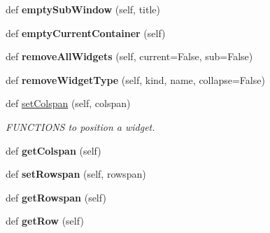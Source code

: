 \begin{DoxyCompactItemize}
def {\bfseries empty\+Sub\+Window} (self, title)
\item 
\mbox{\label{class_python_01_g_u_i_1_1appjar_1_1gui_a349ee206b43493b008e83422e02e1c1d}} 
def {\bfseries empty\+Current\+Container} (self)
\item 
\mbox{\label{class_python_01_g_u_i_1_1appjar_1_1gui_a4b19ed7d7b2a6e254685c9065d165875}} 
def {\bfseries remove\+All\+Widgets} (self, current=False, sub=False)
\item 
\mbox{\label{class_python_01_g_u_i_1_1appjar_1_1gui_ad7ad986a390f5d060cd1902e4ad8850e}} 
def {\bfseries remove\+Widget\+Type} (self, kind, name, collapse=False)
\item 
\mbox{\label{class_python_01_g_u_i_1_1appjar_1_1gui_a42e117ae97d9e09474b1c394ae647306}} 
def \hyperlink{class_python_01_g_u_i_1_1appjar_1_1gui_a42e117ae97d9e09474b1c394ae647306}{set\+Colspan} (self, colspan)
\begin{DoxyCompactList}\small\item\em F\+U\+N\+C\+T\+I\+O\+NS to position a widget. \end{DoxyCompactList}\item 
\mbox{\label{class_python_01_g_u_i_1_1appjar_1_1gui_a1a7683be60662df09d63cb616c77dcbd}} 
def {\bfseries get\+Colspan} (self)
\item 
\mbox{\label{class_python_01_g_u_i_1_1appjar_1_1gui_a3d7ea006e9d5e89fd4f1caf596609470}} 
def {\bfseries set\+Rowspan} (self, rowspan)
\item 
\mbox{\label{class_python_01_g_u_i_1_1appjar_1_1gui_a6b9e12fcddf708f7d82ca459526c1f9a}} 
def {\bfseries get\+Rowspan} (self)
\item 
\mbox{\label{class_python_01_g_u_i_1_1appjar_1_1gui_a2b39101e30b833373074b37436e93939}} 
def {\bfseries get\+Row} (self)
\item 
\mbox{\label{class_python_01_g_u_i_1_1appjar_1_1gui_add6acc31e153961bd28476ea8701fbc5}} 

\end{DoxyCompactItemize}
